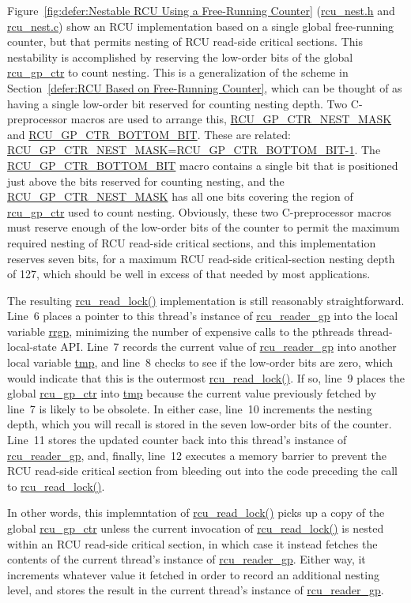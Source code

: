 Figure~\ref{fig:defer:Nestable RCU Using a Free-Running Counter}
(\url{rcu_nest.h} and \url{rcu_nest.c})
show an RCU implementation based on a single global free-running counter,
but that permits nesting of RCU read-side critical sections.
This nestability is accomplished by reserving the low-order bits of the
global \url{rcu_gp_ctr} to count nesting.
This is a generalization of the scheme in
Section~\ref{defer:RCU Based on Free-Running Counter},
which can be thought of as having a single low-order bit reserved
for counting nesting depth.
Two C-preprocessor macros are used to arrange this,
\url{RCU_GP_CTR_NEST_MASK} and
\url{RCU_GP_CTR_BOTTOM_BIT}.
These are related: \url{RCU_GP_CTR_NEST_MASK=RCU_GP_CTR_BOTTOM_BIT-1}.
The \url{RCU_GP_CTR_BOTTOM_BIT} macro contains a single bit that is
positioned just above the bits reserved for counting nesting,
and the \url{RCU_GP_CTR_NEST_MASK} has all one bits covering the
region of \url{rcu_gp_ctr} used to count nesting.
Obviously, these two C-preprocessor macros must reserve enough
of the low-order bits of the counter to permit the maximum required
nesting of RCU read-side critical sections, and this implementation
reserves seven bits, for a maximum RCU read-side critical-section
nesting depth of 127, which should be well in excess of that needed
by most applications.

The resulting \url{rcu_read_lock()} implementation is still reasonably
straightforward.
Line~6 places a pointer to this thread's instance of \url{rcu_reader_gp}
into the local variable \url{rrgp}, minimizing the number of expensive
calls to the pthreads thread-local-state API.
Line~7 records the current value of \url{rcu_reader_gp} into another
local variable \url{tmp}, and line~8 checks to see if the low-order
bits are zero, which would indicate that this is the outermost
\url{rcu_read_lock()}.
If so, line~9 places the global \url{rcu_gp_ctr} into \url{tmp} because
the current value previously fetched by line~7 is likely to be obsolete.
In either case, line~10 increments the nesting depth, which you will
recall is stored in the seven low-order bits of the counter.
Line~11 stores the updated counter back into this thread's instance
of \url{rcu_reader_gp}, and, finally, line~12 executes a memory
barrier to prevent the RCU read-side critical section from bleeding out
into the code preceding the call to \url{rcu_read_lock()}.

In other words, this implemntation of \url{rcu_read_lock()} picks up a copy
of the global \url{rcu_gp_ctr} unless the current invocation of
\url{rcu_read_lock()} is nested within an RCU read-side critical section,
in which case it instead fetches the contents of the current thread's
instance of \url{rcu_reader_gp}.
Either way, it increments whatever value it fetched in order to record
an additional nesting level, and stores the result in the current
thread's instance of \url{rcu_reader_gp}.

